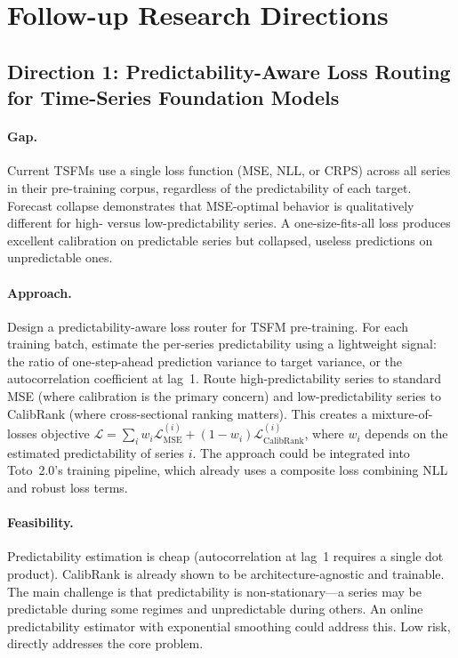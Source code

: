 \documentclass[11pt,a4paper]{article}
\begin{document}
\section{Follow-up Research Directions}

\subsection{Direction 1: Predictability-Aware Loss Routing for Time-Series Foundation Models}

\paragraph{Gap.} Current TSFMs use a single loss function (MSE, NLL, or CRPS) across all series in their pre-training corpus, regardless of the predictability of each target. Forecast collapse demonstrates that MSE-optimal behavior is qualitatively different for high- versus low-predictability series. A one-size-fits-all loss produces excellent calibration on predictable series but collapsed, useless predictions on unpredictable ones.

\paragraph{Approach.} Design a predictability-aware loss router for TSFM pre-training. For each training batch, estimate the per-series predictability using a lightweight signal: the ratio of one-step-ahead prediction variance to target variance, or the autocorrelation coefficient at lag~1. Route high-predictability series to standard MSE (where calibration is the primary concern) and low-predictability series to CalibRank (where cross-sectional ranking matters). This creates a mixture-of-losses objective $\mathcal{L} = \sum_i w_i \mathcal{L}_{\text{MSE}}^{(i)} + (1 - w_i) \mathcal{L}_{\text{CalibRank}}^{(i)}$, where $w_i$ depends on the estimated predictability of series $i$. The approach could be integrated into Toto~2.0's training pipeline, which already uses a composite loss combining NLL and robust loss terms.

\paragraph{Feasibility.} Predictability estimation is cheap (autocorrelation at lag~1 requires a single dot product). CalibRank is already shown to be architecture-agnostic and trainable. The main challenge is that predictability is non-stationary---a series may be predictable during some regimes and unpredictable during others. An online predictability estimator with exponential smoothing could address this. Low risk, directly addresses the core problem.
\end{document}
